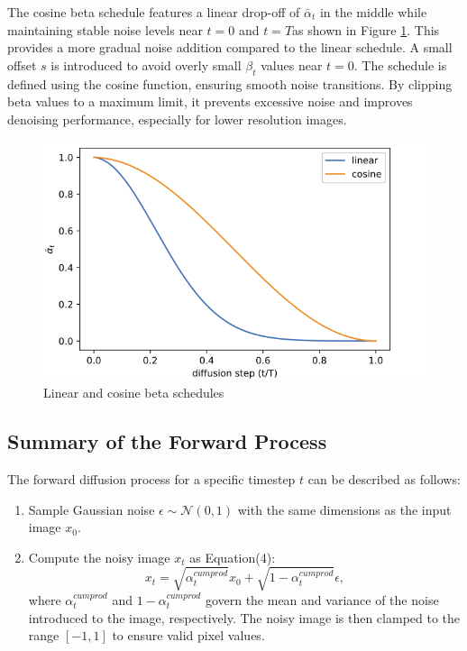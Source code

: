 \documentclass[letterpaper]{article} %
\begin{document}
The cosine beta schedule features a linear drop-off of $\bar{\alpha}_t$ in the middle while maintaining stable noise levels near $t = 0$ and $t = T$as shown in Figure \ref{fig:figure1}. This provides a more gradual noise addition compared to the linear schedule. A small offset $s$ is introduced to avoid overly small $\beta_t$ values near $t = 0$. The schedule is defined using the cosine function, ensuring smooth noise transitions. By clipping beta values to a maximum limit, it prevents excessive noise and improves denoising performance, especially for lower resolution images.

\begin{figure}[htbp]
    \centering
    \includegraphics[width=0.88\linewidth]{f1.png} %
    \caption{Linear and cosine beta schedules}
    \label{fig:figure1}
\end{figure}

\subsection{Summary of the Forward Process}
The forward diffusion process for a specific timestep $t$ can be described as follows:
\begin{enumerate}
\item Sample Gaussian noise $\epsilon \sim \mathcal{N}(0, 1)$ with the same dimensions as the input image $x_0$.
\item Compute the noisy image $x_t$ as Equation(4):
\begin{equation}
    x_t = \sqrt{\alpha^{cumprod}_t} x_0 + \sqrt{1 - \alpha^{cumprod}_t} \epsilon,
\end{equation}
\noindent where $\alpha^{cumprod}_t$ and $1 - \alpha^{cumprod}_t$ govern the mean and variance of the noise introduced to the image, respectively. The noisy image is then clamped to the range $[-1, 1]$ to ensure valid pixel values.
\end{enumerate}
\end{document}
